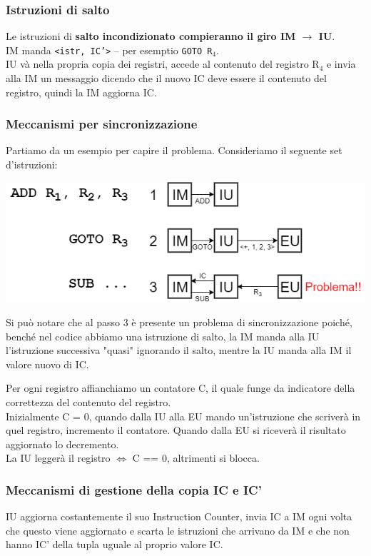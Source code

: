 \documentclass[10pt]{report}
\begin{document}
\subsubsection{Istruzioni di salto}
Le istruzioni di \textbf{salto incondizionato compieranno il giro IM $\rightarrow$ IU}.\\
IM manda \texttt{<istr, IC'>} -- per esemptio \texttt{GOTO R$_4$}.\\
IU và nella propria copia dei registri, accede al contenuto del registro R$_4$ e invia alla IM un messaggio dicendo che il nuovo IC deve essere il contenuto del registro, quindi la IM aggiorna IC.
\subsubsection{Meccanismi per sincronizzazione}
Partiamo da un esempio per capire il problema. Consideriamo il seguente set d'istruzioni:
\begin{center}
\includegraphics[scale=0.7]{pipelinesincprobl.png}
\end{center}
Si può notare che al passo 3 è presente un problema di sincronizzazione poiché, benché nel codice abbiamo una istruzione di salto, la IM manda alla IU l'istruzione successiva "quasi" ignorando il salto, mentre la IU manda alla IM il valore nuovo di IC.
\pagebreak

Per ogni registro affianchiamo un contatore C, il quale funge da indicatore della correttezza del contenuto del registro.\\
Inizialmente C = 0, quando dalla IU alla EU mando un'istruzione che scriverà in quel registro, incremento il contatore. Quando dalla EU si riceverà il risultato aggiornato lo decremento.\\
La IU leggerà il registro $\Leftrightarrow$ C == 0, altrimenti si blocca.
\subsubsection{Meccanismi di gestione della copia IC e IC'}
IU aggiorna costantemente il suo Instruction Counter, invia IC a IM ogni volta che questo viene aggiornato e scarta le istruzioni che arrivano da IM e che non hanno IC' della tupla uguale al proprio valore IC.
\end{document}
